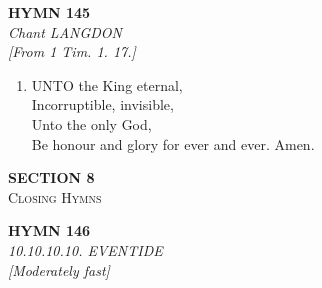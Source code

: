 \documentclass[11pt,a4paper]{article}
\begin{document}
\newpage
\begin{center}
    {\Large \textbf{HYMN 145}}
    \\
    \textit{Chant LANGDON}
    \\
    \textit{\small [From 1 Tim. 1. 17.]}
\end{center}
\vspace{1em}

\begin{enumerate}
    \item UNTO the King eternal, \\
        Incorruptible, invisible, \\
        Unto the only God, \\
        Be honour and glory for ever and ever. Amen.

\end{enumerate}

\newpage
\thispagestyle{empty}
\vspace*{3.5cm}
\begin{center}
    {\LARGE \textbf{SECTION 8}}\\[0.8em]
    {\Large \textsc{Closing Hymns}}
\end{center}
\vspace{3.5cm}

\newpage
\begin{center}
    {\Large \textbf{HYMN 146\textdagger{}}}
    \\
    \textit{10.10.10.10. EVENTIDE}
    \\
    \textit{\small [Moderately fast]}
\end{center}
\vspace{1em}
\end{document}

